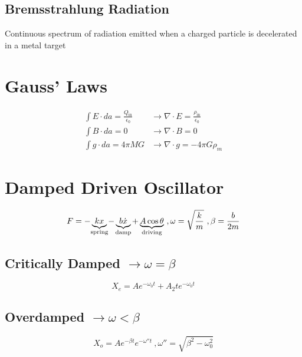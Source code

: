 \documentclass[10pt,a4paper]{article}
\begin{document}
\subsection{Bremsstrahlung Radiation} %
\label{sub:bremsstrahlung_radiation}
Continuous spectrum of radiation emitted when a charged particle is decelerated in a metal target

\section{Gauss' Laws} %
\label{sec:gauss_laws}
\begin{align}
\int E \cdot da = \frac{Q_{\textrm{in}}}{\epsilon_0} &\rightarrow \nabla \cdot E = \frac{\rho_{\textrm{in}}}{\epsilon_0}\\
\int B\cdot da = 0 &\rightarrow \nabla \cdot B = 0\\
\int g\cdot da = 4\pi MG &\rightarrow \nabla \cdot g = -4\pi G \rho_m
\end{align}

\section{Damped Driven Oscillator} %
\label{sec:damped_driven_oscillator}
\begin{equation}
    F=-\underbrace{kx}_{\mathclap{\textrm{spring}}}-\underbrace{b\dot{x}}_{\mathclap{\textrm{damp}}}+\underbrace{A\cos\theta}_{\mathclap{\textrm{driving}}}~, \omega = \sqrt{\frac{k}{m}}~, \beta = \frac{b}{2m}
\end{equation}
\subsection{Critically Damped $\rightarrow \omega = \beta$} %
\label{sub:critically_damped_}
\begin{equation}
    X_e = Ae^{-\omega_0t} + A_2te^{-\omega_0t}
\end{equation}
\subsection{Overdamped $\rightarrow \omega < \beta$} %
\label{sub:overdamped_}
\begin{equation}
    X_o = Ae^{-\beta t}e^{-\omega'' t}~,\omega'' = \sqrt{\beta^2 - \omega_0^2}
\end{equation}
\end{document}
